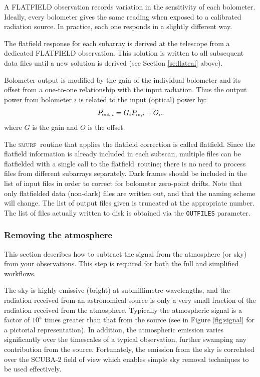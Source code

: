 \documentclass[twoside,11pt]{article}
\newcommand{\xref}[3]{#1}
\newcommand{\xlabel}[1]{}
\renewcommand{\_}{\texttt{\symbol{95}}}
\newcommand{\SMURF}{\textsc{smurf}}
\newcommand{\task}[1]{\textsf{#1}}
\newcommand{\flatfield}{\xref{\task{flatfield}}{sun258}{FLATFIELD}}
\begin{document}
A FLATFIELD observation records variation in the sensitivity of each
bolometer. Ideally, every bolometer gives the same reading when
exposed to a calibrated radiation source. In practice, each one
responds in a slightly different way.

The flatfield response for each subarray is derived at the telescope
from a dedicated FLATFIELD observation. This solution is written to
all subsequent data files until a new solution is derived (see Section
\ref{se:flatcal} above).

Bolometer output is modified by the gain of the individual bolometer
and its offset from a one-to-one relationship with the input
radiation. Thus the output power from bolometer $i$ is related to the
input (optical) power by:
\begin{equation}
P_{{\rm out},i} = G_i P_{{\rm in},i} + O_i.
\end{equation}
where $G$ is the gain and $O$ is the offset.

The \SMURF\ routine that applies the flatfield correction is called
\flatfield. Since the flatfield information is already included in
each subscan, multiple files can be flatfielded with a single call to
the \flatfield\ routine; there is no need to process files from
different subarrays separately. Dark frames should be included in the
list of input files in order to correct for bolometer zero-point
drifts. Note that only flatfielded data (non-dark) files are written
out, and that the naming scheme will change. The list of output files
given is truncated at the appropriate number. The list of files
actually written to disk is obtained via the \texttt{OUTFILES}
parameter.

\subsubsection{\xlabel{skysub}Removing the atmosphere\label{se:skysub}}

This section describes how to subtract the signal from the atmosphere
(or sky) from your observations. This step is required for both the
full and simplified workflows.

The sky is highly emissive (bright) at submillimetre wavelengths, and
the radiation received from an astronomical source is only a very
small fraction of the radiation received from the
atmosphere. Typically the atmospheric signal is a factor of $10^5$
times greater than that from the source (see in Figure
\ref{fig:signal} for a pictorial representation). In addition, the
atmospheric emission varies significantly over the timescales of a
typical observation, further swamping any contribution from the
source. Fortunately, the emission from the sky is correlated over the
SCUBA-2 field of view which enables simple sky removal techniques to
be used effectively.
\end{document}
